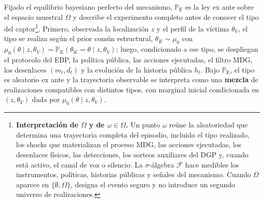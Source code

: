 \documentclass[12pt]{article}
\newenvironment{fnnote}{%
  \begin{minipage}[t]{\linewidth}%
  \sloppy
}{\end{minipage}}
\theoremstyle{definition}
\theoremstyle{remark}
\newcommand{\ProbE}{\mathbb{P}_{\mathrm{E}}}
\newcommand{\1}{\mathbf{1}}
\begin{document}
Fijado el equilibrio bayesiano perfecto del mecanismo, $\ProbE$ es la ley ex ante sobre el espacio muestral $\Omega$ y describe el experimento completo antes de conocer el tipo del captor\footnote{\begin{fnnote}\textbf{Interpretación de $\Omega$ y de $\omega\in\Omega$.} Un punto $\omega$ reúne la aleatoriedad que determina una trayectoria completa del episodio, incluido el tipo realizado, los shocks que materializan el proceso MDG, las acciones ejecutadas, los desenlaces físicos, las detecciones, los sorteos auxiliares del DGP y, cuando está activo, el canal de voz o silencio. La $\sigma$-álgebra $\mathcal{F}$ hace medibles los instrumentos, políticas, historias públicas y señales del mecanismo. Cuando $\Omega$ aparece en $\{\emptyset,\Omega\}$, designa el evento seguro y no introduce un segundo universo de realizaciones.\end{fnnote}}. Primero, observada la localización $z$ y el perfil de la víctima $\theta_V$, el tipo se realiza según el prior común estructural, $\theta_K\sim\mu_0$ con $\mu_0(\theta \mid z, \theta_V)=\ProbE(\theta_K = \theta \mid z, \theta_V)$; luego, condicionado a ese tipo, se despliegan el protocolo del EBP, la política pública, las acciones ejecutadas, el filtro MDG, los desenlaces $(m_t,d_t)$ y la evolución de la historia pública $h_t$. Bajo $\ProbE$, el tipo es aleatorio ex ante y la trayectoria observable se interpreta como una \textbf{mezcla} de realizaciones compatibles con distintos tipos, con marginal inicial condicionada en $(z, \theta_V)$ dada por $\mu_0(\theta \mid z, \theta_V)$.
\end{document}
